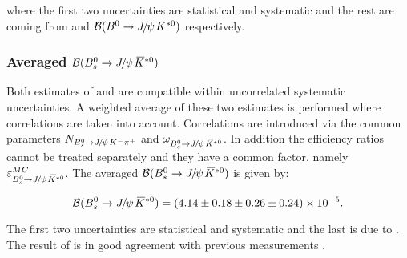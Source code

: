  \noindent where the first two uncertainties are statistical and systematic and the rest are coming from \fdfs and $\BRof\BdJpsiKst$ respectively.

\subsubsection{Averaged $\BRof\BsJpsiKst$}
Both estimates of  and  are compatible within uncorrelated systematic uncertainties.
A weighted average of these two estimates is performed where correlations are taken into account.
Correlations are introduced via the common parameters $N_{\BsJpsiKpi}$ and $\omega_{\BsJpsiKst}$.
In addition the efficiency ratios cannot be treated separately and they have a common factor,
namely $\varepsilon_{\BsJpsiKst}^{MC}$. The averaged $\BRof\BsJpsiKst$ is given by:

\begin{equation}
  \centering
\BRof\BsJpsiKst = (4.14 \pm 0.18 \pm 0.26 \pm 0.24 )\times 10^{-5}.
\label{Br_total}
\end{equation}

\noindent The first two uncertainties are statistical and systematic and the last is due to \fdfs.
The result of  is in good agreement with previous measurements \cite{Aaij:2012nh}.
